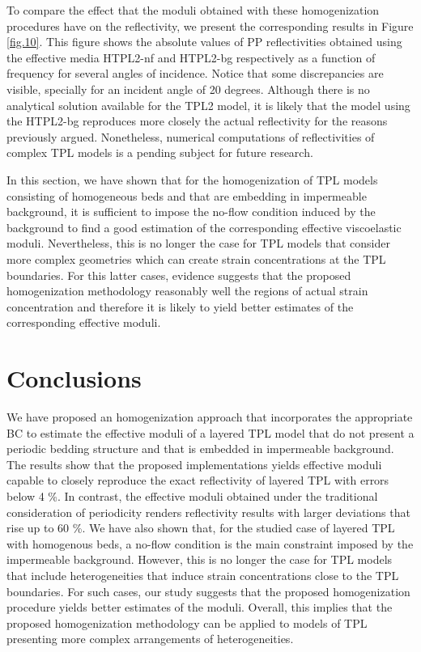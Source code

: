 \documentclass[draft]{agujournal2019}
\begin{document}
To compare the effect that the moduli obtained with these homogenization procedures have on the reflectivity, we present the corresponding results in Figure \ref{fig.10}. This figure shows the absolute values of PP reflectivities obtained using the effective media HTPL2-nf and HTPL2-bg respectively as a function of frequency for several angles of incidence. Notice that some discrepancies are visible, specially for an incident angle of 20 degrees. Although there is no analytical solution available for the TPL2 model, it is likely that the model using the HTPL2-bg reproduces more closely the actual reflectivity for the reasons previously argued. Nonetheless, numerical computations of reflectivities of complex TPL models is a pending subject for future research.

In this section, we have shown that for the homogenization of TPL models consisting of homogeneous beds and that are embedding in impermeable background, it is sufficient to impose the no-flow condition induced by the background to find a good estimation of the corresponding effective viscoelastic moduli. Nevertheless, this is no longer the case for TPL models that consider more complex geometries which can create strain concentrations at the TPL boundaries. For this latter cases, evidence suggests that the proposed homogenization methodology reasonably well the regions of actual strain concentration and therefore it is likely to yield better estimates of the corresponding effective moduli.

\section{Conclusions}
We have proposed an homogenization approach that incorporates the appropriate BC to estimate the effective moduli of a layered TPL model that do not present a periodic bedding structure and that is embedded in impermeable background.  The results show that the proposed implementations yields effective moduli capable to closely reproduce the exact reflectivity of layered TPL with errors below 4 \%. In contrast, the effective moduli obtained under the traditional consideration of periodicity renders reflectivity results with larger deviations that rise up to 60 \%. We  have also shown  that, for the studied case of layered TPL with homogenous beds, a no-flow condition is the main constraint imposed  by the impermeable background. However, this is no longer the case for TPL models that include heterogeneities that induce strain concentrations close to the TPL boundaries. For such cases, our study suggests that the proposed homogenization procedure yields better estimates of the moduli. Overall, this implies that the proposed homogenization methodology can be applied to models of TPL presenting more complex arrangements of heterogeneities.
\end{document}
